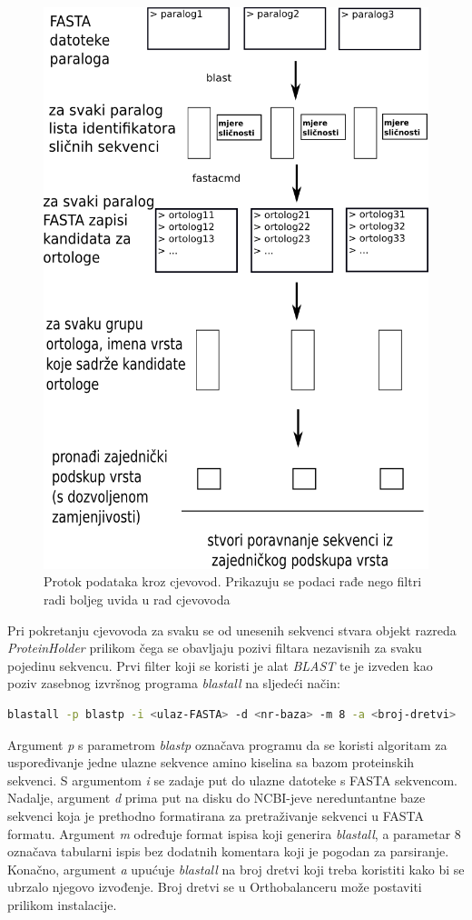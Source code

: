 \begin{figure}[h!]
\centering
\includegraphics[width=4.5in]{figures/cjevovod.png}
\caption{Protok podataka kroz cjevovod. Prikazuju se podaci rađe nego filtri
radi boljeg uvida u rad cjevovoda}
\label{fig:cjevovod}
\end{figure}

Pri pokretanju cjevovoda za svaku se od unesenih sekvenci stvara objekt razreda
\emph{ProteinHolder} prilikom čega se obavljaju pozivi filtara nezavisnih za
svaku pojedinu sekvencu. Prvi filter koji se koristi je alat
\emph{BLAST}\cite{altschul1997gapped} te je izveden kao poziv zasebnog izvršnog
programa \emph{blastall} na sljedeći način:

\begin{lstlisting}[language=bash]
blastall -p blastp -i <ulaz-FASTA> -d <nr-baza> -m 8 -a <broj-dretvi>
\end{lstlisting}

Argument \emph{p} s parametrom \emph{blastp} označava programu da se koristi
algoritam za uspoređivanje jedne ulazne sekvence amino kiselina sa bazom
proteinskih sekvenci. S argumentom \emph{i} se zadaje put do ulazne datoteke s
FASTA sekvencom. Nadalje, argument \emph{d} prima put na disku do NCBI-jeve 
nereduntantne baze sekvenci koja je prethodno formatirana za pretraživanje
sekvenci u FASTA formatu. Argument \emph{m} određuje format ispisa koji generira
\emph{blastall}, a parametar 8 označava tabularni ispis bez dodatnih komentara
koji je pogodan za parsiranje. Konačno, argument \emph{a} upućuje
\emph{blastall} na broj dretvi koji treba koristiti kako bi se ubrzalo njegovo
izvođenje. Broj dretvi se u Orthobalanceru može postaviti prilikom instalacije.

